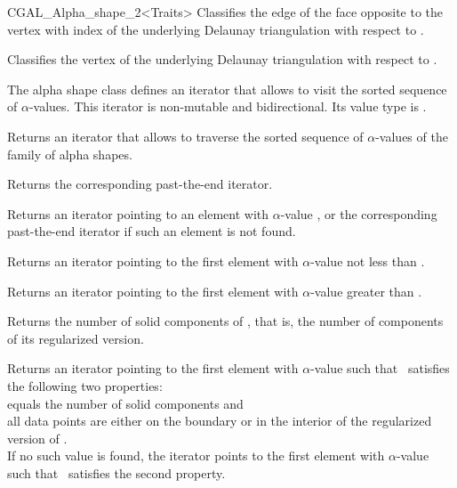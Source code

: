 \begin{ccClassTemplate} {CGAL_Alpha_shape_2<Traits>}
{Classifies the edge of the face  opposite to the vertex with index  of the underlying Delaunay triangulation with respect to \ccVar.}	

{Classifies the vertex  of the underlying Delaunay triangulation with respect to \ccVar.}



\smallskip
The alpha shape class defines an iterator that allows to visit the
sorted sequence of $\alpha$-values. This iterator is
non-mutable and bidirectional. Its value type is
.

{Returns an iterator that allows to traverse the
sorted sequence of $\alpha$-values of the family of alpha shapes.}

{Returns the corresponding past-the-end iterator.}

{Returns an iterator pointing to an element with $\alpha$-value
, or the corresponding past-the-end iterator if such 
an element is not found.}

{Returns an iterator pointing to the first element with
$\alpha$-value not less than .}

{Returns an iterator pointing to the first element with $\alpha$-value
greater than .}


{Returns the number of solid components of \ccVar, that is, the number of components of its regularized version.}

{Returns an iterator pointing to the first element with $\alpha$-value
such that \ccVar\ satisfies the following two properties:\\
 equals the number of solid components and \\
all data points are either on the boundary or in the interior of the regularized version of \ccVar.\\
If no such value is found, the iterator points to the first element with 
$\alpha$-value such that \ccVar\ satisfies the second property.}


\end{ccClassTemplate}
